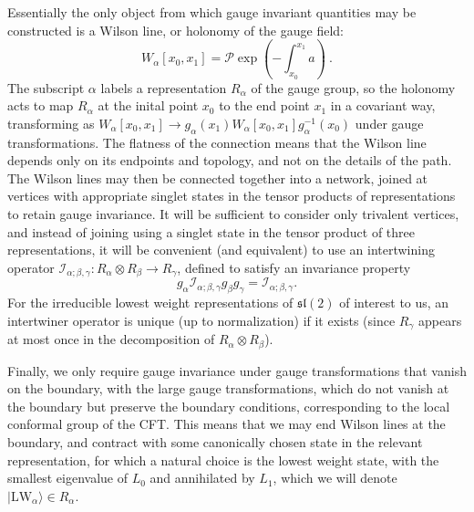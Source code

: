 \documentclass[12pt]{article}
\newcommand{\lie}[1]{\mathfrak{#1}}
\newcommand{\intertwine}[3]{\mathcal{I}_{#1;#2,#3}}
\newcommand{\lw}[1]{|\text{LW}_{#1}\rangle}
\begin{document}
Essentially the only object from which gauge invariant quantities may be constructed is a Wilson line, or holonomy of the gauge field:
\begin{equation}
	W_\alpha[x_0,x_1] = \mathcal{P}\exp\left(-\int_{x_0}^{x_1} a\right)~.
\end{equation}
The subscript $\alpha$ labels a representation $R_\alpha$ of the gauge group, so the holonomy acts to map $R_\alpha$ at the inital point $x_0$ to the end point $x_1$ in a covariant way, transforming as $W_\alpha[x_0,x_1]\rightarrow g_\alpha(x_1) W_\alpha[x_0,x_1] g_\alpha^{-1}(x_0)$ under gauge transformations. The flatness of the connection means that the Wilson line depends only on its endpoints and topology, and not on the details of the path. The Wilson lines may then be connected together into a network, joined at vertices with appropriate singlet states in the tensor products of representations to retain gauge invariance. It will be sufficient to consider only trivalent vertices, and instead of joining using a singlet state in the tensor product of three representations, it will be convenient (and equivalent) to use an intertwining operator $\intertwine{\alpha}{\beta}{\gamma}:R_\alpha\otimes R_\beta\to R_\gamma$, defined to satisfy an invariance property
\begin{equation}
	g_\alpha \intertwine{\alpha}{\beta}{\gamma} g_\beta g_\gamma = \intertwine{\alpha}{\beta}{\gamma}.
\end{equation}
For the irreducible lowest weight representations of $\lie{sl}(2)$ of interest to us, an intertwiner operator is unique (up to normalization) if it exists (since $R_\gamma$ appears at most once in the decomposition of $R_\alpha\otimes R_\beta$).

Finally, we only require gauge invariance under gauge transformations that vanish on the boundary, with the large gauge transformations, which do not vanish at the boundary but preserve the boundary conditions, corresponding to the local conformal group of the CFT. This means that we may end Wilson lines at the boundary, and contract with some canonically chosen state in the relevant representation, for which a natural choice is the lowest weight state, with the smallest eigenvalue of $L_0$ and annihilated by $L_1$, which we will denote $\lw{\alpha}\in R_\alpha$.
\end{document}
